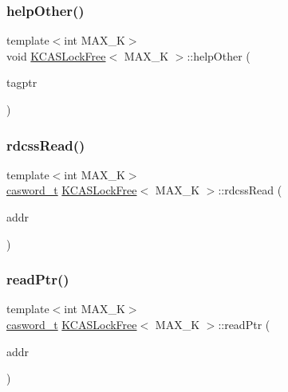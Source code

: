 \mbox{\label{classKCASLockFree_ae587033414b12de35c07b6c13fe434bd}} 
\subsubsection{\texorpdfstring{help\+Other()}{helpOther()}}
{\footnotesize\ttfamily template$<$int M\+A\+X\+\_\+K$>$ \\
void \hyperlink{classKCASLockFree}{K\+C\+A\+S\+Lock\+Free}$<$ M\+A\+X\+\_\+K $>$\+::help\+Other (\begin{DoxyParamCaption}\item[{\hyperlink{kcas__reuse__impl_8h_a22868433cf4300ce32f000ed8c8dd76c}{kcastagptr\+\_\+t}}]{tagptr }\end{DoxyParamCaption})}

\mbox{\label{classKCASLockFree_a0d29756cf4f43e7f138cea73b2f781b5}} 
\subsubsection{\texorpdfstring{rdcss\+Read()}{rdcssRead()}}
{\footnotesize\ttfamily template$<$int M\+A\+X\+\_\+K$>$ \\
\hyperlink{rq__unsafe_8h_ad45142aaf2ff20a036dc6242b8483e9c}{casword\+\_\+t} \hyperlink{classKCASLockFree}{K\+C\+A\+S\+Lock\+Free}$<$ M\+A\+X\+\_\+K $>$\+::rdcss\+Read (\begin{DoxyParamCaption}\item[{\hyperlink{rq__unsafe_8h_ad45142aaf2ff20a036dc6242b8483e9c}{casword\+\_\+t} volatile $\ast$}]{addr }\end{DoxyParamCaption})}

\mbox{\label{classKCASLockFree_a54d120c4f122f75613aef3235e60f6a5}} 
\subsubsection{\texorpdfstring{read\+Ptr()}{readPtr()}}
{\footnotesize\ttfamily template$<$int M\+A\+X\+\_\+K$>$ \\
\hyperlink{rq__unsafe_8h_ad45142aaf2ff20a036dc6242b8483e9c}{casword\+\_\+t} \hyperlink{classKCASLockFree}{K\+C\+A\+S\+Lock\+Free}$<$ M\+A\+X\+\_\+K $>$\+::read\+Ptr (\begin{DoxyParamCaption}\item[{\hyperlink{rq__unsafe_8h_ad45142aaf2ff20a036dc6242b8483e9c}{casword\+\_\+t} volatile $\ast$}]{addr }\end{DoxyParamCaption})}

